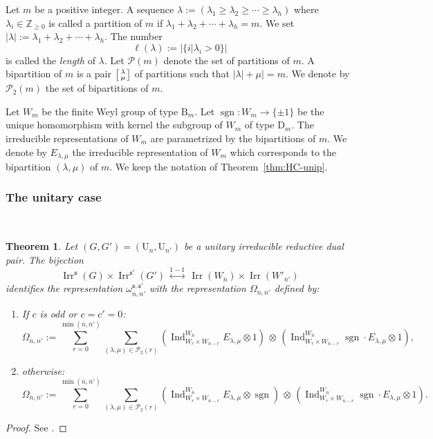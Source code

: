 \documentclass[12pt]{amsart}
\numberwithin{equation}{subsection}
\newtheorem{thm}[equation]{Theorem}
\newcommand{\ZZ}{\mathbb{Z}}
\newcommand{\cP}{\mathcal{P}}
\newcommand{\sgn}{\operatorname{sgn}}
\newcommand{\Ind}{\operatorname{Ind}}
\newcommand{\rU}{\mathrm{U}}
\newcommand{\fs}{\mathfrak{s}}
\newcommand{\Irr}{\operatorname{Irr}}
\def\rB{{\mathrm{B}}}
\def\rD{{\mathrm{D}}}
\begin{document}
Let $m$ be a positive integer. A sequence $\lambda:=(\lambda_1\ge\lambda_2\ge\cdots\ge\lambda_h)$ where $\lambda_i\in\ZZ_{\ge 0}$ is called a partition of $m$ if $\lambda_1+\lambda_2+\cdots+\lambda_h=m$. 
We set $|\lambda|:=\lambda_1+\lambda_2+\cdots+\lambda_h$. The number 
\begin{equation} \label{eqn:length}
\ell(\lambda) := |\{ i | \lambda_i > 0 \}|
\end{equation} 
 is called the \textit{length} of $\lambda$. 
Let $\cP(m)$ denote the set of partitions of $m$. 
A bipartition of $m$ is a pair $\left[\begin{smallmatrix} \lambda\cr \mu\end{smallmatrix}\right]$ of partitions such that $|\lambda|+\mu|=m$.
We denote by $\cP_2(m)$ the set of bipartitions of $m$.

Let  $W_m$ be the finite Weyl group of type $\rB_m$. Let $\sgn\colon W_m\to \{\pm 1\}$ be the unique homomorphism with kernel the subgroup of $W_m$ of type $\rD_m$. The irreducible representations of  $W_m$ are parametrized by the bipartitions of $m$.
We denote by $E_{\lambda,\mu}$ the  irreducible representation of $W_m$ which corresponds to the bipartition $(\lambda,\mu)$ of $m$. 
We keep the notation of Theorem~\ref{thm:HC-unip}.

\subsubsection{The unitary case}\

\begin{thm} \label{thm:unip-UU}
Let $(G,G')=(\rU_n, \rU_{n'})$ be a unitary irreducible reductive dual pair. 
The bijection 
\[\Irr^\fs(G)\times\Irr^{\fs'}(G')\,\overset{1-1}{\longleftrightarrow}\, \Irr(W_{\overline{n}})\times \Irr(W'_{\overline{n}'})\]
identifies the representation $\omega_{n,n'}^{\fs,\fs'}$ with the representation $\Omega_{\overline{n},\overline{n}'}$ defined by:
\begin{enumerate}
\item If $c$ is odd or $c=c'=0$:
\[\Omega_{\overline{n},\overline{n}'}:=\sum_{r=0}^{\min(\overline{n},\overline{n}')}\sum_{(\lambda,\mu)\in\cP_2(r)}
\left(\Ind_{W_r\times W_{\overline{n}-r}}^{W_{\overline{n}}}E_{\lambda,\mu}\otimes 1\right)\,\otimes\,
\left(\Ind_{W_r\times W_{\overline{n}-r}}^{W_{\overline{n}}} \sgn \cdot E_{\lambda,\mu}\otimes1\right),\]
\item otherwise:
\[\Omega_{\overline{n},\overline{n}'}:=\sum_{r=0}^{\min(\overline{n},\overline{n}')}\sum_{(\lambda,\mu)\in\cP_2(r)}
\left(\Ind_{W_r\times W_{\overline{n}-r}}^{W_{\overline{n}}}E_{\lambda,\mu}\otimes\sgn\right)\,\otimes\,
\left(\Ind_{W_r\times W_{\overline{n}-r}}^{W_{\overline{n}}} \sgn \cdot E_{\lambda,\mu}\otimes1\right).\]
\end{enumerate}
\end{thm}
\begin{proof}
See \cite[Th\'eor\`eme~3.10]{AMR}.
\end{proof}
\end{document}
